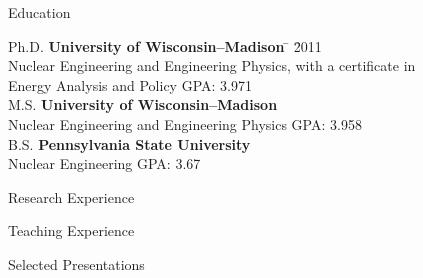 \documentclass{resume2} %
\begin{document}

\begin{rSection}{Education}

\begin{tabbing}
Ph.D. \hspace*{2 em}\= \textbf{University of Wisconsin--Madison} \hspace*{5em} \= \hspace*{15em} \= 2011 \\
      \> Nuclear Engineering and Engineering Physics, with a certificate in \\ \> Energy Analysis and Policy \> GPA: 3.971\\
%
M.S. \hspace*{2 em}\> \textbf{University of Wisconsin--Madison} \>  \\
      \> Nuclear Engineering and Engineering Physics \> GPA: 3.958\\
%
B.S. \hspace*{2 em}\> \textbf{Pennsylvania State University} \>  \\
      \> Nuclear Engineering \> GPA: 3.67\\
\end{tabbing}

\end{rSection}

\begin{rSection}{Research Experience}

\end{rSection}

\begin{rSection}{Teaching Experience}

\end{rSection}

\begin{rSection}{Selected Presentations}

\end{rSection}
\end{document}
